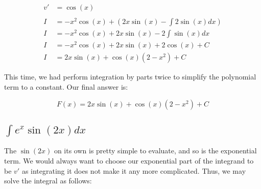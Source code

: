 \documentclass[12pt]{article}
\begin{document}
\begin{align}
    v'          & = \cos(x)                                                 \\
    \nonumber                                                               \\
    I           & = -x^2\cos(x) + \left(2x\sin(x) - \int 2\sin(x) dx\right) \\
    I           & = -x^2\cos(x) + 2x\sin(x) - 2\int \sin(x) dx              \\
    I           & = -x^2\cos(x) + 2x\sin(x) + 2\cos(x) + C                  \\
    I           & = 2x\sin(x) + \cos(x)(2 - x^2) + C
\end{align}


This time, we had perform integration by parts twice to simplify the polynomial term to a constant.
Our final answer is:

$$
    F(x) = 2x\sin(x) + \cos(x)(2 - x^2) + C
$$

\subsection{$\int e^x \sin(2x) dx$}

The $\sin(2x)$ on its own is pretty simple to evaluate, and so is the exponential term.
We would always want to choose our exponential part of the integrand to be $v'$ as integrating it does not make it any more complicated.
Thus, we may solve the integral as follows:
\end{document}
